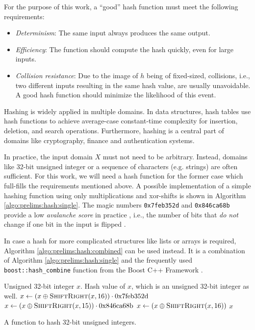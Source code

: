 		For the purpose of this work, a \enquote{good} hash function must meet the following requirements:
		
		\begin{itemize}
			\item \textit{Determinism}: The same input always produces the same output.
			\item \textit{Efficiency}: The function should compute the hash quickly, even for large inputs.
			\item \textit{Collision resistance}: Due to the image of $h$ being of fixed-sized, collisions, i.e., two different inputs resulting in the same hash value, are usually unavoidable. A good hash function should minimize the likelihood of this event.
		\end{itemize}
		
		Hashing is widely applied in multiple domains. In data structures, hash tables use hash functions to achieve average-case constant-time complexity for insertion, deletion, and search operations.
		Furthermore, hashing is a central part of domains like cryptography, finance and authentication systems. 
		
		In practice, the input domain $X$ must not need to be arbitrary. Instead, domains like 32-bit unsigned integer or a sequence of characters (e.g. strings) are often sufficient.
		For this work, we will need a hash function for the former case which full-fills the requirements mentioned above.
		A possible implementation of a simple hashing function using only multiplications and xor-shifts is shown in Algorithm \ref{algo:prelims:hash:single}.
		The magic numbers \lstinline|0x7feb352d| and \lstinline|0x846ca68b| provide a low \textit{avalanche score} in practice \cite{christopherwellonsHashFunctionProspector2025}, i.e., the number of bits that \textit{do not} change if one bit in the input is flipped \cite{9923931}.
		
		In case a hash for more complicated structures like lists or arrays is required, Algorithm \ref{algo:prelims:hash:combined} can be used instead.
		It is a combination of Algorithm \ref{algo:prelims:hash:single} and the frequently used \lstinline|boost::hash_combine| function from the Boost C++ Framework \cite{boostBoostLibraries}.
		
		\begin{algorithm}[ht!]
				\centering
			\begin{algorithmic}
				\Require Unsigned 32-bit integer $x$.
				\Ensure Hash value of $x$, which is an unsigned 32-bit integer as well.
				\Statex
					\State $x \gets (x \oplus \Call{ShiftRight}{x, 16}) \cdot \mathrm{0x7feb352d}$
					\State $x \gets (x \oplus \Call{ShiftRight}{x, 15}) \cdot \mathrm{0x846ca68b}$
					\State $x \gets (x \oplus \Call{ShiftRight}{x, 16})$
					\State \Return $x$
				\EndFunction
			\end{algorithmic}
			\caption{A function to hash 32-bit unsigned integers.}
			\label{algo:prelims:hash:single}
		\end{algorithm}
		

